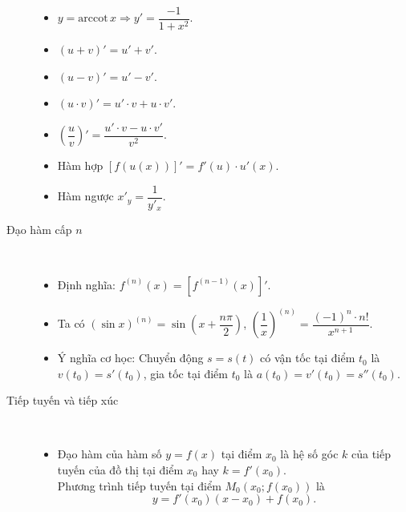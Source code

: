 \begin{description}
\begin{multicols}{2}
\begin{itemize}
	    \item $y=\mathrm{arccot}\,x\Rightarrow y'=\dfrac{-1}{1+x^2}$.
	    \item $(u+v)'=u'+v'$.
	    \item $(u-v)'=u'-v'$.
	    \item $(u\cdot v)'=u'\cdot v+u\cdot v'$.
	    \item $\left(\dfrac{u}{v}\right)'=\dfrac{u'\cdot v-u\cdot v'}{v^2}$.
	    \item Hàm hợp $\left[f(u(x))\right]'=f'(u)\cdot u'(x)$.
	    \item Hàm ngược $x'_y=\dfrac{1}{y'_x}$.
	\end{itemize}
	\end{multicols}
	\item[Đạo hàm cấp $n$]\
	\begin{itemize}
	    \item Định nghĩa: $f^{(n)}(x)=[f^{(n-1)}(x)]'$.
	    \item Ta có $(\sin x)^{(n)}=\sin\left(x+\dfrac{n\pi}{2}\right)$, $\left(\dfrac{1}{x}\right)^{(n)}=\dfrac{(-1)^n\cdot n!}{x^{n+1}}$.
	    \item Ý nghĩa cơ học: Chuyển động $s=s(t)$ có vận tốc tại điểm $t_0$ là $v(t_0)=s'(t_0)$, gia tốc tại điểm $t_0$ là $a(t_0)=v'(t_0)=s''(t_0)$.
	\end{itemize}
	\newpage
	\item[Tiếp tuyến và tiếp xúc]\
	    \begin{itemize}
	        \item 
            \immini
	        {
	        Đạo hàm của hàm số $y=f(x)$ tại điểm $x_0$ là hệ số góc $k$ của tiếp tuyến của đồ thị tại điểm $x_0$ hay $k=f'(x_0)$.\\
	        Phương trình tiếp tuyến tại điểm $M_0(x_0;f(x_0))$ là \[y=f'(x_0)(x-x_0)+f(x_0).\]
	        }
	        {
	        }
\end{itemize}
\end{description}
